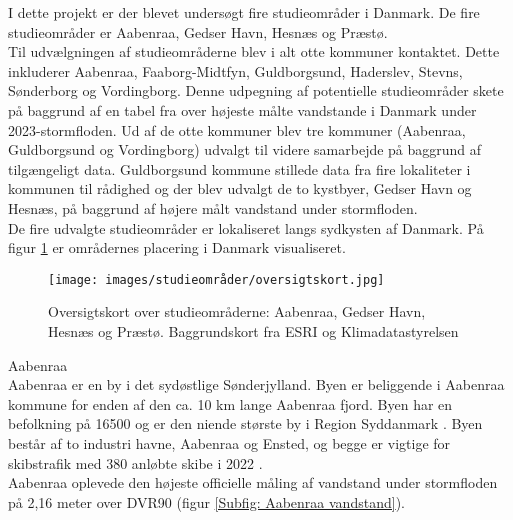 
I dette projekt er der blevet undersøgt fire studieområder i Danmark. De fire studieområder er Aabenraa, Gedser Havn, Hesnæs og Præstø.\\

Til udvælgningen af studieområderne blev i alt otte kommuner kontaktet. Dette inkluderer Aabenraa, Faaborg-Midtfyn, Guldborgsund, Haderslev, Stevns, Sønderborg og Vordingborg. Denne udpegning af potentielle studieområder skete på baggrund af en tabel fra \cite{damberg_vaerste_2023} over højeste målte vandstande i Danmark under 2023-stormfloden. 
Ud af de otte kommuner blev tre kommuner (Aabenraa, Guldborgsund og Vordingborg) udvalgt til videre samarbejde på baggrund af tilgængeligt data. Guldborgsund kommune stillede data fra fire lokaliteter i kommunen til rådighed og der blev udvalgt de to kystbyer, Gedser Havn og Hesnæs, på baggrund af højere målt vandstand under stormfloden. \\

De fire udvalgte studieområder er lokaliseret langs sydkysten af Danmark. På figur \ref{Figur: Oversigtskort} er områdernes placering i Danmark visualiseret.
\begin{figure}[H]
    \centering
    \texttt{[image: images/studieområder/oversigtskort.jpg]}
    \caption{Oversigtskort over studieområderne: Aabenraa, Gedser Havn, Hesnæs og Præstø. Baggrundskort fra ESRI og Klimadatastyrelsen}
    \label{Figur: Oversigtskort}
\end{figure}

{\large Aabenraa}\\
Aabenraa er en by i det sydøstlige Sønderjylland. Byen er beliggende i Aabenraa kommune for enden af den ca. 10 km lange Aabenraa fjord. Byen har en befolkning på 16500 og er den niende største by i Region Syddanmark \citep{danmarks_statistisk_mobile_nodate}. Byen består af to industri havne, Aabenraa og Ensted, og begge er vigtige for skibstrafik med 380 anløbte skibe i 2022 \citep{aabenraa_havn_aabenraa-havn-talogfakta2022_2022}.\\
Aabenraa oplevede den højeste officielle måling af vandstand under stormfloden på 2,16 meter over DVR90 (figur \ref{Subfig: Aabenraa vandstand}). \\

